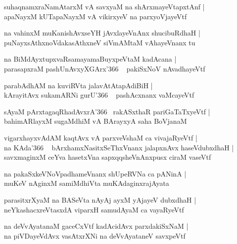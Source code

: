 \documentclass[twoside,12pt,openright]{book}
\newcounter{shloka}[chapter]
\begin{document}
\begin{shloka}
suhaqnamxraNamAtarxM vA savxyaM na shArxmayeVtapxtAnf |\\
apaNayxM kUTapaNayxM vA vikirxyeV na parxyoVjayeVtf 
\end{shloka}

\begin{shloka}
na vahinxM muKanishAvxseYH jAvxlayeVnAnx shucibuRdhaH |\\
puNayxsAthxnoVdakasAthxneV siVmAMtaM vAhayeVnanx tu 
\end{shloka}

\begin{shloka}
na BiMdAyxtupxvaRsamayamaBuyxpeVtaM kadAcana |\\
parasapxraM pashUnAvxyXGArx\char'366 ~ pakiSxNoV nAvadhayeVtf 
\end{shloka}

\begin{shloka}
parabAdhAM na kuviRVta jalavAtAtapAdiBiH |\\
kArayitAvx sukamARNi gurU\char'366 ~ pashAcxnanx vaMcayeVtf 
\end{shloka}

\begin{shloka}
sAyaM pArxtagaqRhadAvxrA\char'366 ~rakASxthaR pariGaTaTxyeVtf |\\
bahimARlayxM sugaMdhiM vA BArayxyA saha BoVjanaM 
\end{shloka}

\begin{shloka}
vigarxhayxvAdAM kaqtAvx vA parxveVshaM ca vivajaRyeVtf |\\
na KAda\char'366 ~ bArxhamxNasitxSeThxVnanx jalapxnAvx haseVdubxdhaH |\\
savxmaginxM ceYva hasetxVna sapxqqsheVnAnxpusx ciraM vaseVtf 
\end{shloka}

\begin{shloka}
na pakaSxkeVNoVpadhameVnanx shUpeRVNa ca pANinA |\\
muKeV nAginxM samiMdhiVta muKAdaginxrajAyata 
\end{shloka}

\begin{shloka}
parasitxrXyaM na BASeVta nAyAj ayxM yAjayeV dubxdhaH |\\
neYkashacxreVtasxdA viparxH samudAyaM ca vayaRyeVtf
\end{shloka}

\begin{shloka}
na deVvAyatanaM gaceCxVtf kadAcidAvx parxdakiSxNaM |\\
na piVDayeVdAvx vasAtxrXNi na deVvAyataneV savxpeVtf 
\end{shloka}
\end{document}
